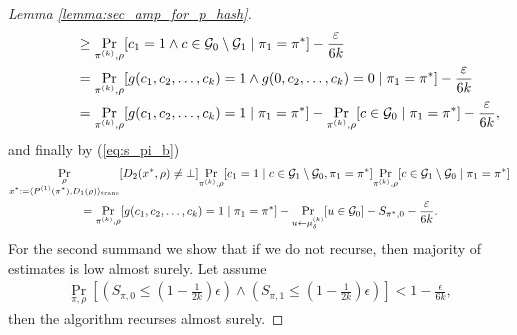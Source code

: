 \begin{proof}[Lemma \ref{lemma:sec_amp_for_p_hash}]
\begin{align*}
  &\mbox\qquad\qquad \geq \underset{\pi^{(k)}, \rho}{\Pr}[c_1 = 1 \land c \in \mathcal{G}_0 \setminus \mathcal{G}_1 \mid \pi_1 = \pi^*] - \frac{\varepsilon}{6k} \\
  &\mbox\qquad\qquad = \underset{\pi^{(k)}, \rho}{\Pr}[g(c_1, c_2,\dots, c_k) = 1 \land g(0, c_2, \dots, c_k) = 0 \mid \pi_1 = \pi^*] - \frac{\varepsilon}{6k} \\
  &\mbox\qquad\qquad = \underset{\pi^{(k)}, \rho}{\Pr}[g(c_1, c_2,\dots, c_k) = 1 \mid \pi_1 = \pi^*] -  \underset{\pi^{(k)}, \rho}{\Pr}[c \in \mathcal{G}_0 \mid \pi_1 = \pi^*] - \frac{\varepsilon}{6k},
\end{align*}
and finally by (\ref{eq:s_pi_b})
\begin{align}
  \label{ineq:first_part}
  &\underset{\substack{\rho \\ x^* := \langle P^{(1)}(\pi^*), D_1(\rho) \rangle_{\text{trans}}}}{\Pr}[D_2(x^*,\rho) \neq \bot]
  \underset{\pi^{(k)}, \rho}{\Pr}[c_1 = 1 \mid c \in \mathcal{G}_1 \setminus \mathcal{G}_0, \pi_1 = \pi^*]
  \underset{\pi^{(k)}, \rho}{\Pr}[c \in \mathcal{G}_1 \setminus \mathcal{G}_0 \mid \pi_1 = \pi^*] \notag\\
  &\mbox\qquad\qquad\qquad = \underset{\pi^{(k)}, \rho}{\Pr}[g(c_1, c_2,\dots, c_k) = 1 \mid \pi_1 = \pi^*] -  \underset{u \leftarrow \mu_{\delta}^{(k)}}{\Pr}[u \in \mathcal{G}_0]  - S_{\pi^*,0} - \frac{\varepsilon}{6k}.
\end{align}
For the second summand we show that if we do not recurse, then majority of estimates is low almost surely.
Let assume
\begin{align}
\underset{\pi, \rho}{\Pr}\left[\left(S_{\pi,0} \leq (1 - \frac{1}{2k})\epsilon\right) \land \left( S_{\pi,1} \leq (1-\frac{1}{2k})\epsilon\right)\right] < 1 - \frac{\epsilon}{6k},
\end{align}
then the algorithm recurses almost surely.

\end{proof}

